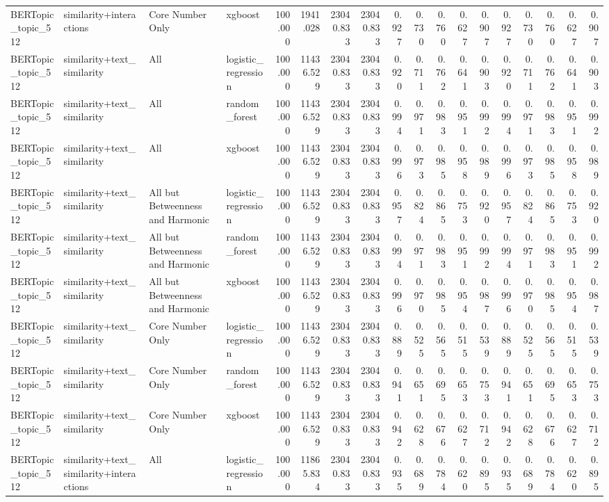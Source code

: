 \begin{tabular}{llllrrrrrrrrrrrrrr}
BERTopic\_topic\_512 & similarity+interactions & Core Number Only & xgboost & 100.000 & 1941.028 & 23040.833 & 23040.833 & 0.927 & 0.730 & 0.760 & 0.627 & 0.907 & 0.927 & 0.730 & 0.760 & 0.627 & 0.907 \\
BERTopic\_topic\_512 & similarity+text\_similarity & All & logistic\_regression & 100.000 & 11436.529 & 23040.833 & 23040.833 & 0.920 & 0.711 & 0.762 & 0.641 & 0.903 & 0.920 & 0.711 & 0.762 & 0.641 & 0.903 \\
BERTopic\_topic\_512 & similarity+text\_similarity & All & random\_forest & 100.000 & 11436.529 & 23040.833 & 23040.833 & 0.994 & 0.971 & 0.983 & 0.951 & 0.992 & 0.994 & 0.971 & 0.983 & 0.951 & 0.992 \\
BERTopic\_topic\_512 & similarity+text\_similarity & All & xgboost & 100.000 & 11436.529 & 23040.833 & 23040.833 & 0.996 & 0.973 & 0.985 & 0.958 & 0.989 & 0.996 & 0.973 & 0.985 & 0.958 & 0.989 \\
BERTopic\_topic\_512 & similarity+text\_similarity & All but Betweenness and Harmonic & logistic\_regression & 100.000 & 11436.529 & 23040.833 & 23040.833 & 0.957 & 0.824 & 0.865 & 0.753 & 0.920 & 0.957 & 0.824 & 0.865 & 0.753 & 0.920 \\
BERTopic\_topic\_512 & similarity+text\_similarity & All but Betweenness and Harmonic & random\_forest & 100.000 & 11436.529 & 23040.833 & 23040.833 & 0.994 & 0.971 & 0.983 & 0.951 & 0.992 & 0.994 & 0.971 & 0.983 & 0.951 & 0.992 \\
BERTopic\_topic\_512 & similarity+text\_similarity & All but Betweenness and Harmonic & xgboost & 100.000 & 11436.529 & 23040.833 & 23040.833 & 0.996 & 0.970 & 0.985 & 0.954 & 0.987 & 0.996 & 0.970 & 0.985 & 0.954 & 0.987 \\
BERTopic\_topic\_512 & similarity+text\_similarity & Core Number Only & logistic\_regression & 100.000 & 11436.529 & 23040.833 & 23040.833 & 0.889 & 0.525 & 0.565 & 0.515 & 0.539 & 0.889 & 0.525 & 0.565 & 0.515 & 0.539 \\
BERTopic\_topic\_512 & similarity+text\_similarity & Core Number Only & random\_forest & 100.000 & 11436.529 & 23040.833 & 23040.833 & 0.941 & 0.651 & 0.695 & 0.653 & 0.753 & 0.941 & 0.651 & 0.695 & 0.653 & 0.753 \\
BERTopic\_topic\_512 & similarity+text\_similarity & Core Number Only & xgboost & 100.000 & 11436.529 & 23040.833 & 23040.833 & 0.942 & 0.628 & 0.676 & 0.627 & 0.712 & 0.942 & 0.628 & 0.676 & 0.627 & 0.712 \\
BERTopic\_topic\_512 & similarity+text\_similarity+interactions & All & logistic\_regression & 100.000 & 11865.834 & 23040.833 & 23040.833 & 0.935 & 0.689 & 0.784 & 0.620 & 0.895 & 0.935 & 0.689 & 0.784 & 0.620 & 0.895 \\

\end{tabular}

